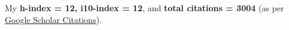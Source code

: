 My \textbf{h-index = 12, i10-index = 12}, and \textbf{total citations = 3004} (as per \href{https://scholar.google.com/citations?hl=en&user=6-7FYjIAAAAJ&authuser=2}{Google Scholar Citations}).

\nocite{*}

\printbibliography[heading={none},type=article]
